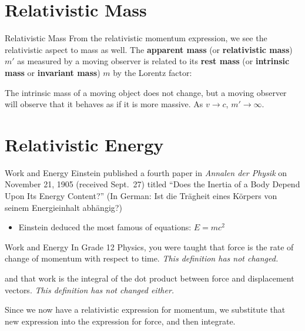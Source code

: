\documentclass[12pt,compress,aspectratio=169]{beamer}
\newcommand{\mb}[1]{\mathbf{#1}}
\newcommand{\bigsqrt}{\ensuremath\sqrt{1-\left(\frac{v}{c}\right)^2}}
\newcommand{\eq}[2]{\vspace{#1}{\Large\begin{displaymath}#2\end{displaymath}}}
\begin{document}
\section[Rel.\ Mass]{Relativistic Mass}

\begin{frame}{Relativistic Mass}
  From the relativistic momentum expression, we see the relativistic aspect to
  mass as well. The \textbf{apparent mass} (or \textbf{relativistic mass}) $m'$
  as measured by a moving observer is related to its \textbf{rest mass} (or
  \textbf{intrinsic mass} or \textbf{invariant mass}) $m$ by the Lorentz factor:

  \eq{-.18in}{
    \boxed{m'=\frac{m}{\bigsqrt}=\gamma m}
  }
  
  The intrinsic mass of a moving object does not change, but a moving observer
  will observe that it behaves as if it is more massive. As $v\rightarrow c$,
  $m'\rightarrow\infty$.
\end{frame}



\section[Energy]{Relativistic Energy}

\begin{frame}{Work and Energy}
  Einstein published a fourth paper in \emph{Annalen der Physik} on November
  21, 1905 (received Sept.\ 27) titled ``Does the Inertia of a Body Depend Upon
  Its Energy Content?'' (In German: Ist die Tr\"{a}gheit eines K\"{o}rpers von
  seinem Energieinhalt abh\"{a}ngig?)
  \begin{itemize}
  \item Einstein deduced the most famous of equations: $E=mc^2$
  \end{itemize}
\end{frame}


\begin{frame}{Work and Energy}
  In Grade 12 Physics, you were taught that force is the rate of change of
  momentum with respect to time. \emph{This definition has not changed.}

  \eq{-.2in}{
    \mb{F}=\frac{d\mb{p}}{dt}
  }

  \vspace{-.1in}and that work is the integral of the dot product between force
  and displacement vectors. \emph{This definition has not changed either.}

  \eq{-.2in}{
    W=\int\mb{F}\cdot d\mb{x}=\int\frac{d\mb{p}}{dt}\cdot \mb{dx}
  }

  \vspace{-.1in}Since we now have a relativistic expression for momentum, we
  substitute that new expression into the expression for force, and then
  integrate.
\end{frame}
\end{document}
